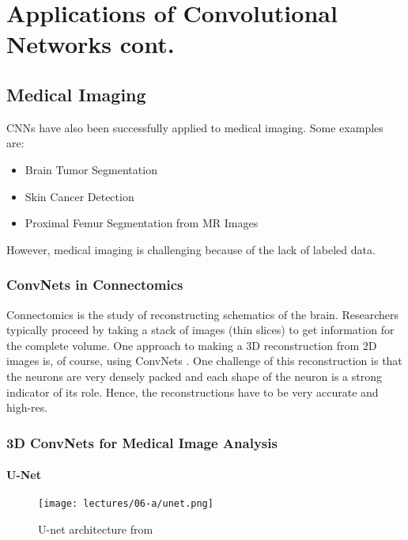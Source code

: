 \chapter{Applications of Convolutional Networks cont.}

\section{Medical Imaging}
CNNs have also been successfully applied to medical imaging. Some examples are:
\begin{itemize}
    \item Brain Tumor Segmentation \cite{braintumor2018}
    \item Skin Cancer Detection \cite{Esteva2017DermatologistlevelCO}
    \item Proximal Femur Segmentation from MR Images \cite{Deniz2018SegmentationOT}
\end{itemize}

However, medical imaging is challenging because of the lack of labeled data.

\subsection{ConvNets in Connectomics}
Connectomics is the study of reconstructing schematics of the brain. Researchers typically proceed by taking a stack of images (thin slices) to get information for the complete volume. One approach to making a 3D reconstruction from 2D images is, of course, using ConvNets \cite{jain2010}. One challenge of this reconstruction is that the neurons are very densely packed and each shape of the neuron is a strong indicator of its role. Hence, the reconstructions have to be very accurate and high-res.

\subsection{3D ConvNets for Medical Image Analysis}

\subsubsection{U-Net}
\begin{figure}[ht]
    \centering
    \texttt{[image: lectures/06-a/unet.png]}
    \caption{U-net architecture from \citep{unet}}
    \label{fig:unet}
\end{figure}

